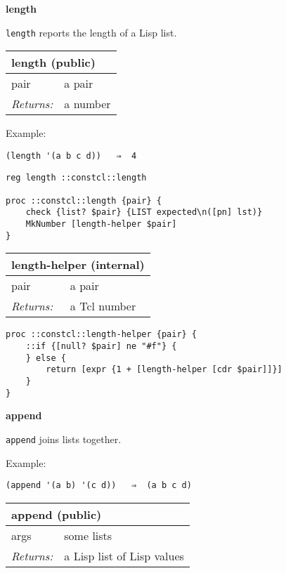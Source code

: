 \documentclass{report}
\begin{document}
\textbf{length}


\texttt{length} reports the length of a Lisp list.

\begin{tabular}{ |l l| }
\hline
\multicolumn{2}{|l|}{length (public)} \\
\hline
pair & a pair \\
\textit{Returns:} & a number \\
\hline
\end{tabular}


Example:

\noindent\makebox[\linewidth]{\rule{\linewidth}{0.4pt}}
\begin{lstlisting}
(length '(a b c d))   ⇒  4
\end{lstlisting}
\noindent\makebox[\linewidth]{\rule{\linewidth}{0.4pt}}
\noindent\makebox[\linewidth]{\rule{\linewidth}{0.4pt}}
\begin{lstlisting}
reg length ::constcl::length
 
proc ::constcl::length {pair} {
    check {list? $pair} {LIST expected\n([pn] lst)}
    MkNumber [length-helper $pair]
}
\end{lstlisting}
\noindent\makebox[\linewidth]{\rule{\linewidth}{0.4pt}}
\begin{tabular}{ |l l| }
\hline
\multicolumn{2}{|l|}{length-helper (internal)} \\
\hline
pair & a pair \\
\textit{Returns:} & a Tcl number \\
\hline
\end{tabular}

\noindent\makebox[\linewidth]{\rule{\linewidth}{0.4pt}}
\begin{lstlisting}
proc ::constcl::length-helper {pair} {
    ::if {[null? $pair] ne "#f"} {
    } else {
        return [expr {1 + [length-helper [cdr $pair]]}]
    }
}
\end{lstlisting}
\noindent\makebox[\linewidth]{\rule{\linewidth}{0.4pt}}

\textbf{append}


\texttt{append} joins lists together.


Example:

\noindent\makebox[\linewidth]{\rule{\linewidth}{0.4pt}}
\begin{lstlisting}
(append '(a b) '(c d))   ⇒  (a b c d)
\end{lstlisting}
\noindent\makebox[\linewidth]{\rule{\linewidth}{0.4pt}}
\begin{tabular}{ |l l| }
\hline
\multicolumn{2}{|l|}{append (public)} \\
\hline
args & some lists \\
\textit{Returns:} & a Lisp list of Lisp values \\
\hline
\end{tabular}
\end{document}
